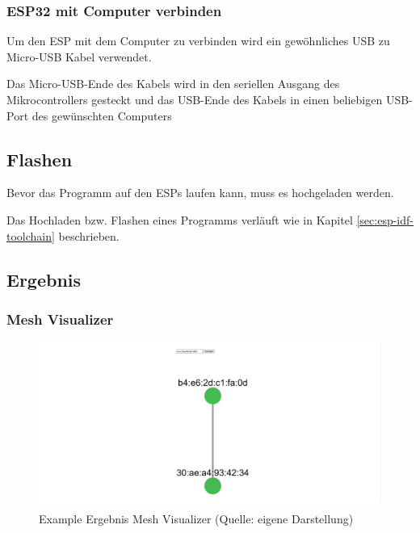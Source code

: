 \subsubsection{ESP32 mit Computer verbinden}
Um den ESP mit dem Computer zu verbinden wird ein gewöhnliches USB zu Micro-USB Kabel verwendet.

Das Micro-USB-Ende des Kabels wird in den seriellen Ausgang des Mikrocontrollers gesteckt und das USB-Ende des Kabels in einen beliebigen USB-Port des gewünschten Computers

\subsection{Flashen}

Bevor das Programm auf den ESPs laufen kann, muss es hochgeladen werden.

Das Hochladen bzw. Flashen eines Programms verläuft wie in Kapitel \ref{sec:esp-idf-toolchain} beschrieben.

\subsection{Ergebnis}\label{sec:example-result}
\subsubsection{Mesh Visualizer}

\begin{figure}[H]
    \begin{center}
        \includegraphics[scale=0.3]{images/example_result_mesh_visualizer.png}
        \caption{Example Ergebnis Mesh Visualizer (Quelle: eigene Darstellung)}
        \label{abb:example_result_mesh_visualizer}
    \end{center}
\end{figure}

